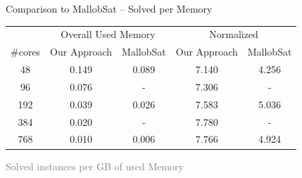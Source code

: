 \documentclass[]{sdqbeamer}
\begin{document}
\begin{frame}{Comparison to MallobSat -- Solved per Memory}
    \center
    \begin{table}%
        \center
        \begin{tabular}{ ccccc }
          \toprule
          \multicolumn{1}{c}{} & \multicolumn{2}{c}{Overall Used Memory} & \multicolumn{2}{c}{Normalized}\\
          \#cores & Our Approach & MallobSat & Our Approach & MallobSat \\
          \midrule
          48  & 0.149 & 0.089 & 7.140 & 4.256\\
          96  & 0.076 & -     & 7.306 & -\\
          192 & 0.039 & 0.026 & 7.583 & 5.036\\
          384 & 0.020 & -     & 7.780 & -\\
          768 & 0.010 & 0.006 & 7.766 & 4.924\\
          \bottomrule
        \end{tabular}
    \end{table}
    \vfill
    \textcolor{gray}{Solved instances per GB of used Memory}
\end{frame}
\end{document}
